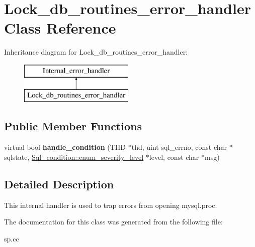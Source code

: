 \hypertarget{classLock__db__routines__error__handler}{}\section{Lock\+\_\+db\+\_\+routines\+\_\+error\+\_\+handler Class Reference}
\label{classLock__db__routines__error__handler}
Inheritance diagram for Lock\+\_\+db\+\_\+routines\+\_\+error\+\_\+handler\+:\begin{figure}[H]
\begin{center}
\leavevmode
\includegraphics[height=2.000000cm]{classLock__db__routines__error__handler}
\end{center}
\end{figure}
\subsection*{Public Member Functions}
\begin{DoxyCompactItemize}
\item 
\mbox{\label{classLock__db__routines__error__handler_abfc386da898cef38c45d31e26d625141}} 
virtual bool {\bfseries handle\+\_\+condition} (T\+HD $\ast$thd, uint sql\+\_\+errno, const char $\ast$sqlstate, \mbox{\hyperlink{classSql__condition_ab0602581e19cddb609bfe10c44be4e83}{Sql\+\_\+condition\+::enum\+\_\+severity\+\_\+level}} $\ast$level, const char $\ast$msg)
\end{DoxyCompactItemize}


\subsection{Detailed Description}
This internal handler is used to trap errors from opening mysql.\+proc. 

The documentation for this class was generated from the following file\+:\begin{DoxyCompactItemize}
\item 
sp.\+cc\end{DoxyCompactItemize}
